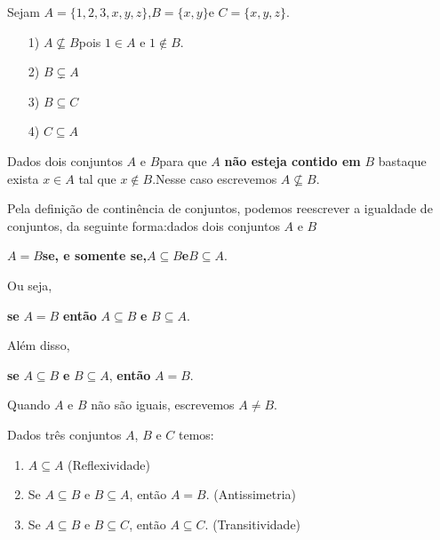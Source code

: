 \documentclass{beamer}
\begin{document}
    \begin{frame}
        \begin{exemplos}
            Sejam $A = \{1,2,3,x,y,z\}$,\pause $B = \{x, y\}$\pause e $C = \{x, y , z\}$.\pause
            \begin{itemize}
                \item[1)] $A \nsubseteq B$\pause pois $1 \in A$ e $1 \notin B$.\pause
                \item[2)] $B \subsetneq A$\pause
                \item[3)] $B \subseteq C$\pause
                \item[4)] $C \subseteq A$\pause
            \end{itemize}
        \end{exemplos}

        \begin{observacao}
            Dados dois conjuntos $A$ e $B$\pause para que $A$ \textbf{n\~ao esteja contido em} $B$ basta\pause que exista $x \in A$ tal que $x \notin B$.\pause Nesse caso escrevemos $A \nsubseteq B$.
        \end{observacao}
    \end{frame}
    \begin{frame}
        Pela defini\c{c}\~ao de contin\^encia de conjuntos, podemos reescrever a igualdade de conjuntos, da seguinte forma:\pause dados dois conjuntos $A$ e $B$\pause
\begin{center}
    $A = B$\quad \textbf{se, e somente se,}\pause\quad $A \subseteq B$\quad\pause \textbf{e}\quad $B \subseteq A$.\pause
\end{center}

Ou seja,
\begin{center}
    \textbf{se} $A = B$ \textbf{ent{\~a}o} $A \subseteq B$ \textbf{e} $B \subseteq A$.\pause
\end{center}

Al\'em disso,
\begin{center}
    \textbf{se} $A \subseteq B$ \textbf{e} $B \subseteq A$, \textbf{ent{\~a}o} $A = B$.\pause
\end{center}

Quando $A$ e $B$ n{\~a}o s{\~a}o iguais, escrevemos $A \neq B$.\pause

\begin{proposicao}
    Dados tr\^es conjuntos $A$, $B$ e $C$ temos:\pause
    \begin{enumerate}[label={\roman*})]
        \item $A\subseteq A$ (Reflexividade)\pause
        \item Se $A\subseteq B \mbox{ e } B\subseteq A$, ent{\~a}o $A=B$. (Antissimetria)\pause
        \item Se $A\subseteq B$ e $B\subseteq C$, ent{\~a}o $A\subseteq C$. (Transitividade)\pause
    \end{enumerate}
\end{proposicao}
    \end{frame}
\end{document}
